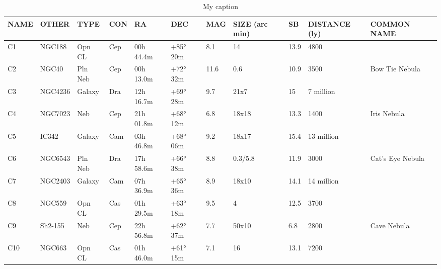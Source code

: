 \begin{table}[h]
\centering
\caption{My caption}
\label{my-label}
\begin{tabular}{@{}lllllllllll@{}}
\toprule
{\bf NAME} & {\bf OTHER} & {\bf TYPE} & {\bf CON} & {\bf RA}  & {\bf DEC} & {\bf MAG} & {\bf SIZE (arc min)} & {\bf SB} & {\bf DISTANCE (ly)} & {\bf COMMON NAME}               \\ \midrule
C1         & NGC188      & Opn CL     & Cep       & 00h 44.4m & +85° 20m  & 8.1       & 14                   & 13.9     & 4800                &                                 \\
C2         & NGC40       & Pln Neb    & Cep       & 00h 13.0m & +72° 32m  & 11.6      & 0.6                  & 10.9     & 3500                & Bow Tie Nebula                  \\
C3         & NGC4236     & Galaxy     & Dra       & 12h 16.7m & +69° 28m  & 9.7       & 21x7                 & 15       & 7 million           &                                 \\
C4         & NGC7023     & Neb        & Cep       & 21h 01.8m & +68° 12m  & 6.8       & 18x18                & 13.3     & 1400                & Iris Nebula                     \\
C5         & IC342       & Galaxy     & Cam       & 03h 46.8m & +68° 06m  & 9.2       & 18x17                & 15.4     & 13 million          &                                 \\
C6         & NGC6543     & Pln Neb    & Dra       & 17h 58.6m & +66° 38m  & 8.8       & 0.3/5.8              & 11.9     & 3000                & Cat's Eye Nebula                \\
C7         & NGC2403     & Galaxy     & Cam       & 07h 36.9m & +65° 36m  & 8.9       & 18x10                & 14.1     & 14 million          &                                 \\
C8         & NGC559      & Opn CL     & Cas       & 01h 29.5m & +63° 18m  & 9.5       & 4                    & 12.5     & 3700                &                                 \\
C9         & Sh2-155     & Neb        & Cep       & 22h 56.8m & +62° 37m  & 7.7       & 50x10                & 6.8      & 2800                & Cave Nebula                     \\
C10        & NGC663      & Opn CL     & Cas       & 01h 46.0m & +61° 15m  & 7.1       & 16                   & 13.1     & 7200                &                                 \\

\end{tabular}
\end{table}
